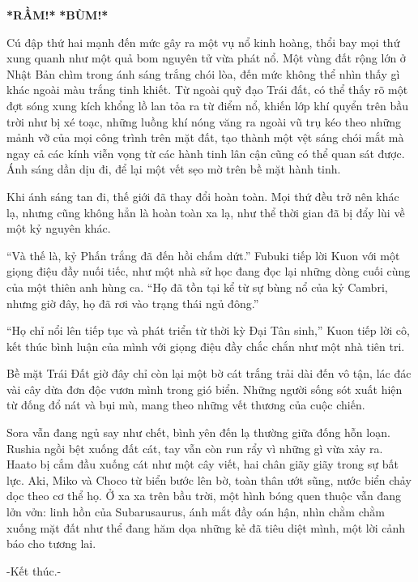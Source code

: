 \documentclass[../main.tex]{subfiles}
\begin{document}

{\Large \textbf{*RẦM!*} \textbf{*BÙM!*}}

Cú đập thứ hai mạnh đến mức gây ra một vụ nổ kinh hoàng, thổi bay mọi thứ xung quanh như một quả bom nguyên tử vừa phát nổ. Một vùng đất rộng lớn ở Nhật Bản chìm trong ánh sáng trắng chói lòa, đến mức không thể nhìn thấy gì khác ngoài màu trắng tinh khiết. Từ ngoài quỹ đạo Trái đất, có thể thấy rõ một đợt sóng xung kích khổng lồ lan tỏa ra từ điểm nổ, khiến lớp khí quyển trên bầu trời như bị xé toạc, những luồng khí nóng văng ra ngoài vũ trụ kéo theo những mảnh vỡ của mọi công trình trên mặt đất, tạo thành một vệt sáng chói mắt mà ngay cả các kính viễn vọng từ các hành tinh lân cận cũng có thể quan sát được. Ánh sáng dần dịu đi, để lại một vết sẹo mờ trên bề mặt hành tinh.

Khi ánh sáng tan đi, thế giới đã thay đổi hoàn toàn. Mọi thứ đều trở nên khác lạ, nhưng cũng không hẳn là hoàn toàn xa lạ, như thể thời gian đã bị đẩy lùi về một kỷ nguyên khác.

``Và thế là, kỷ Phấn trắng đã đến hồi chấm dứt.'' Fubuki tiếp lời Kuon với một giọng điệu đầy nuối tiếc, như một nhà sử học đang đọc lại những dòng cuối cùng của một thiên anh hùng ca. ``Họ đã tồn tại kể từ sự bùng nổ của kỷ Cambri, nhưng giờ đây, họ đã rơi vào trạng thái ngủ đông.''


``Họ chỉ nổi lên tiếp tục và phát triển từ thời kỳ Đại Tân sinh,'' Kuon tiếp lời cô, kết thúc bình luận của mình với giọng điệu đầy chắc chắn như một nhà tiên tri.

Bề mặt Trái Đất giờ đây chỉ còn lại một bờ cát trắng trải dài đến vô tận, lác đác vài cây dừa đơn độc vươn mình trong gió biển. Những người sống sót xuất hiện từ đống đổ nát và bụi mù, mang theo những vết thương của cuộc chiến.

Sora vẫn đang ngủ say như chết, bình yên đến lạ thường giữa đống hỗn loạn. Rushia ngồi bệt xuống đất cát, tay vẫn còn run rẩy vì những gì vừa xảy ra. Haato bị cắm đầu xuống cát như một cây viết, hai chân giãy giãy trong sự bất lực. Aki, Miko và Choco từ biển bước lên bờ, toàn thân ướt sũng, nước biển chảy dọc theo cơ thể họ. Ở xa xa trên bầu trời, một hình bóng quen thuộc vẫn đang lởn vởn: linh hồn của Subarusaurus, ánh mắt đầy oán hận, nhìn chằm chằm xuống mặt đất như thể đang hăm dọa những kẻ đã tiêu diệt mình, một lời cảnh báo cho tương lai.


\begin{center}
  -Kết thúc.-
\end{center}
\end{document}
